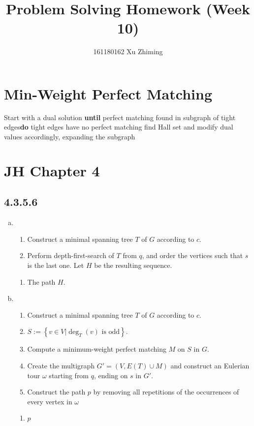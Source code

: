 \documentclass[twocolumn, 10.5pt]{article}
\begin{document}
	\title{Problem Solving Homework (Week 10)}\author{161180162 Xu Zhiming}\maketitle
	\section*{Min-Weight Perfect Matching}
	\begin{codebox}
		\li Start with a dual solution\li 
		\textbf{until} perfect matching found in subgraph of tight edges\zi  \textbf{do}\li 
		\If tight edges have no perfect matching\Then\li 
		find Hall set and modify dual values accordingly, \zi 
		expanding the  subgraph\End
	\end{codebox}
	\section*{JH Chapter 4}
	\subsection*{4.3.5.6}
	\begin{enumerate}[(a)]
		\item 
			\begin{enumerate}[Step 1:]
				\item Construct a minimal spanning tree $T$ of $G$ according to $c$.
				\item Perform depth-first-search of $T$ from $q$, and order the vertices such that $s$ is the last one. Let $H$ be the resulting sequence.
			\end{enumerate}
			\begin{enumerate}[Output:]
				\item The path $H$.
			\end{enumerate}
		\item 
			\begin{enumerate}[Step 1:]
				\item Construct a minimal spanning tree $T$ of $G$ according to $c$.
				\item $S:=\left\{v\in V|\deg_T(v)\text{ is odd}\right\}$.
				\item Compute a minimum-weight perfect matching $M$ on $S$ in $G$.
				\item Create the multigraph $G'=\left(V,E(T)\cup M\right)$ and construct an Eulerian tour $\omega$ starting from $q$, ending on $s$ in $G'$.
				\item Construct the path $p$ by removing all repetitions of the occurrences of every vertex in $\omega$
			\end{enumerate}
			\begin{enumerate}[Output:]
				\item $p$
			\end{enumerate}
	\end{enumerate}
\end{document}
